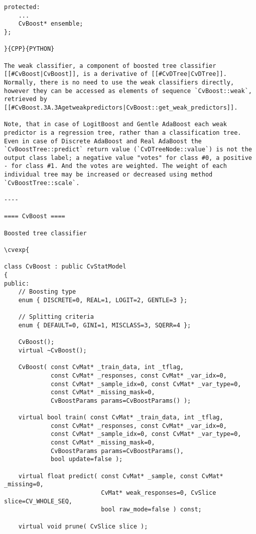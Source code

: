 \begin{verbatim}
protected:
    ...
    CvBoost* ensemble;
};

}{CPP}{PYTHON}

The weak classifier, a component of boosted tree classifier [[#CvBoost|CvBoost]], is a derivative of [[#CvDTree|CvDTree]]. Normally, there is no need to use the weak classifiers directly, however they can be accessed as elements of sequence `CvBoost::weak`, retrieved by [[#CvBoost.3A.3Agetweakpredictors|CvBoost::get_weak_predictors]].

Note, that in case of LogitBoost and Gentle AdaBoost each weak predictor is a regression tree, rather than a classification tree. Even in case of Discrete AdaBoost and Real AdaBoost the `CvBoostTree::predict` return value (`CvDTreeNode::value`) is not the output class label; a negative value "votes" for class #0, a positive - for class #1. And the votes are weighted. The weight of each individual tree may be increased or decreased using method `CvBoostTree::scale`.

----

==== CvBoost ====

Boosted tree classifier

\cvexp{

class CvBoost : public CvStatModel
{
public:
    // Boosting type
    enum { DISCRETE=0, REAL=1, LOGIT=2, GENTLE=3 };

    // Splitting criteria
    enum { DEFAULT=0, GINI=1, MISCLASS=3, SQERR=4 };

    CvBoost();
    virtual ~CvBoost();

    CvBoost( const CvMat* _train_data, int _tflag,
             const CvMat* _responses, const CvMat* _var_idx=0,
             const CvMat* _sample_idx=0, const CvMat* _var_type=0,
             const CvMat* _missing_mask=0,
             CvBoostParams params=CvBoostParams() );

    virtual bool train( const CvMat* _train_data, int _tflag,
             const CvMat* _responses, const CvMat* _var_idx=0,
             const CvMat* _sample_idx=0, const CvMat* _var_type=0,
             const CvMat* _missing_mask=0,
             CvBoostParams params=CvBoostParams(),
             bool update=false );

    virtual float predict( const CvMat* _sample, const CvMat* _missing=0,
                           CvMat* weak_responses=0, CvSlice slice=CV_WHOLE_SEQ,
                           bool raw_mode=false ) const;

    virtual void prune( CvSlice slice );


\end{verbatim}

